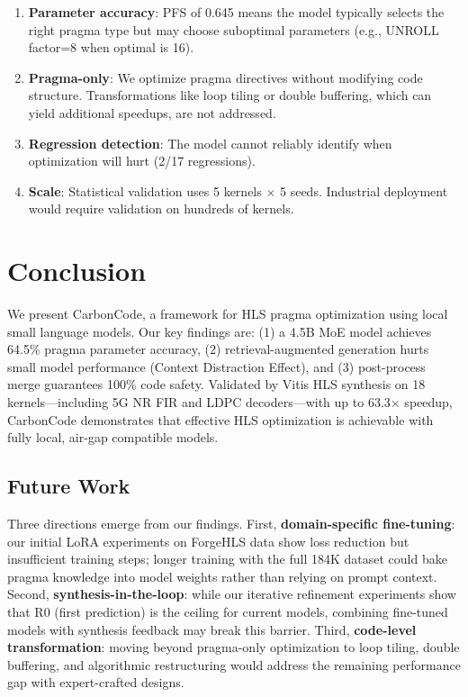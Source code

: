 \documentclass[conference]{IEEEtran}
\begin{document}
\begin{enumerate}
    \item \textbf{Parameter accuracy}: PFS of 0.645 means the model
    typically selects the right pragma type but may choose suboptimal
    parameters (e.g., UNROLL factor=8 when optimal is 16).

    \item \textbf{Pragma-only}: We optimize pragma directives without
    modifying code structure. Transformations like loop tiling or
    double buffering, which can yield additional speedups, are not
    addressed.

    \item \textbf{Regression detection}: The model cannot reliably
    identify when optimization will hurt (2/17 regressions).

    \item \textbf{Scale}: Statistical validation uses 5 kernels
    $\times$ 5 seeds. Industrial deployment would require validation
    on hundreds of kernels.
\end{enumerate}

\section{Conclusion}

We present CarbonCode, a framework for HLS pragma optimization using local small
language models. Our key findings are: (1) a 4.5B MoE model achieves 64.5\%
pragma parameter accuracy, (2) retrieval-augmented generation hurts small model
performance (Context Distraction Effect), and (3) post-process merge guarantees
100\% code safety. Validated by Vitis HLS synthesis on 18 kernels---including
5G NR FIR and LDPC decoders---with up to 63.3$\times$ speedup, CarbonCode
demonstrates that effective HLS optimization is achievable with fully local,
air-gap compatible models.

\subsection{Future Work}

Three directions emerge from our findings. First, \textbf{domain-specific
fine-tuning}: our initial LoRA experiments on ForgeHLS data show loss
reduction but insufficient training steps; longer training with the full
184K dataset could bake pragma knowledge into model weights rather than
relying on prompt context. Second, \textbf{synthesis-in-the-loop}: while
our iterative refinement experiments show that R0 (first prediction) is
the ceiling for current models, combining fine-tuned models with
synthesis feedback may break this barrier. Third, \textbf{code-level
transformation}: moving beyond pragma-only optimization to loop tiling,
double buffering, and algorithmic restructuring would address the
remaining performance gap with expert-crafted designs.
\end{document}
